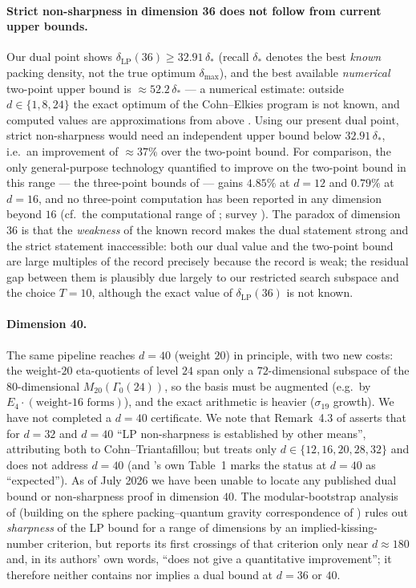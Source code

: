 \documentclass[11pt]{article}
\theoremstyle{remark}
\newcommand{\LP}{\mathrm{LP}}
\begin{document}
\paragraph{Strict non-sharpness in dimension 36 does not follow from current upper bounds.}
Our dual point shows $\delta_{\LP}(36)\ge32.91\,\delta_*$ (recall
$\delta_*$ denotes the best \emph{known} packing density, not the true
optimum $\delta_{\max}$), and the best available \emph{numerical}
two-point upper bound is $\approx52.2\,\delta_*$
\cite{CohnElkies,CT,CohnTable} --- a numerical estimate: outside
$d\in\{1,8,24\}$ the exact optimum of the Cohn--Elkies program is not
known, and computed values are approximations from above
\cite{CT}. Using our present dual point, strict non-sharpness would
need an independent upper bound below $32.91\,\delta_*$, i.e.\ an improvement of
$\approx37\%$ over the two-point bound. For comparison, the only general-purpose
technology quantified to improve on the two-point bound in this
range --- the three-point bounds of \cite{CdLS} --- gains $4.85\%$ at $d=12$ and
$0.79\%$ at $d=16$, and no three-point computation has been reported in
any dimension beyond $16$ (cf.\ the computational range of \cite{CdLS};
survey \cite{VallentinSurvey}). The paradox of
dimension $36$ is that the \emph{weakness} of the known record makes
the dual statement strong and the strict statement inaccessible: both
our dual value and the two-point bound are large multiples of the
record precisely because the record is weak; the residual gap between
them is plausibly due largely to our restricted search subspace and the
choice $T=10$, although the exact value of $\delta_{\LP}(36)$ is not
known.

\paragraph{Dimension 40.} The same pipeline reaches $d=40$
(weight $20$) in principle, with two new costs: the weight-$20$
eta-quotients of level $24$ span only a $72$-dimensional subspace of the
$80$-dimensional $M_{20}(\Gamma_0(24))$, so the basis must be augmented
(e.g.\ by $E_4\cdot(\text{weight-16 forms})$), and the exact arithmetic
is heavier ($\sigma_{19}$ growth). We have not completed a $d=40$
certificate. We note that Remark~4.3 of \cite{Zhou} asserts that for
$d=32$ and $d=40$ ``LP non-sharpness is established by other means'',
attributing both to Cohn--Triantafillou; but \cite{CT} treats only
$d\in\{12,16,20,28,32\}$ and does not address $d=40$ (and \cite{Zhou}'s
own Table~1 marks the status at $d=40$ as ``expected''). As of July 2026
we have been unable to locate any published dual bound or non-sharpness
proof in dimension $40$. The
modular-bootstrap analysis of \cite{AJCHdLT} (building on the sphere
packing--quantum gravity correspondence of \cite{HMR}) rules out
\emph{sharpness}
of the LP bound for a range of dimensions by an implied-kissing-number
criterion, but reports its first crossings of that criterion only near
$d\approx180$ and, in its authors' own words, ``does not give a
quantitative improvement''; it therefore neither contains nor implies a
dual bound at $d=36$ or $40$.
\end{document}

